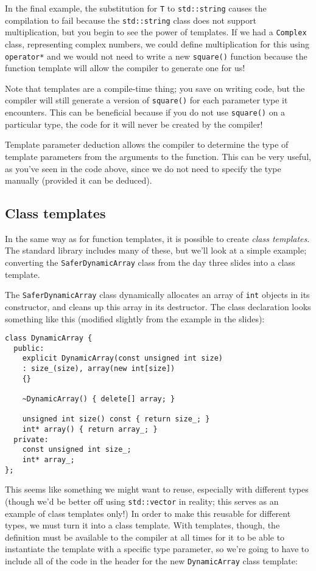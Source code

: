 \documentclass[a4paper]{scrartcl}
\begin{document}
In the final example, the substitution for \verb|T| to \verb|std::string| causes the compilation to fail because the \verb|std::string| class does not support multiplication, but you begin to see the power of templates. If we had a \verb|Complex| class, representing complex numbers, we could define multiplication for this using \verb|operator*| and we would not need to write a new \verb|square()| function because the function template will allow the compiler to generate one for us!

Note that templates are a compile-time thing; you save on writing code, but the compiler will still generate a version of \verb|square()| for each parameter type it encounters. This can be beneficial because if you do not use \verb|square()| on a particular type, the code for it will never be created by the compiler!

Template parameter deduction allows the compiler to determine the type of template parameters from the arguments to the function. This can be very useful, as you've seen in the code above, since we do not need to specify the type manually (provided it can be deduced).

\subsection{Class templates}
In the same way as for function templates, it is possible to create \emph{class templates}. The standard library includes many of these, but we'll look at a simple example; converting the \verb|SaferDynamicArray| class from the day three slides into a class template.

The \verb|SaferDynamicArray| class dynamically allocates an array of \verb|int| objects in its constructor, and cleans up this array in its destructor. The class declaration looks something like this (modified slightly from the example in the slides):

\begin{verbatim}
class DynamicArray {
  public:
    explicit DynamicArray(const unsigned int size)
    : size_(size), array(new int[size])
    {}

    ~DynamicArray() { delete[] array; }
    
    unsigned int size() const { return size_; }
    int* array() { return array_; }
  private:
    const unsigned int size_;
    int* array_;
};
\end{verbatim}

This seems like something we might want to reuse, especially with different types (though we'd be better off using \verb|std::vector| in reality; this serves as an example of class templates only!) In order to make this reusable for different types, we must turn it into a class template. With templates, though, the definition must be available to the compiler at all times for it to be able to instantiate the template with a specific type parameter, so we're going to have to include all of the code in the header for the new \verb|DynamicArray| class template:
\end{document}
